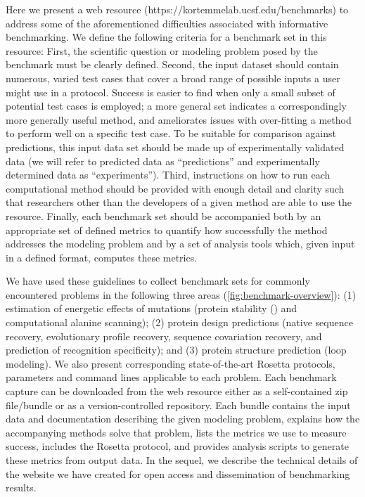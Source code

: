 Here we present a web resource (https://kortemmelab.ucsf.edu/benchmarks) to address some of the aforementioned difficulties associated with informative benchmarking. We define the following criteria for a benchmark set in this resource: First, the scientific question or modeling problem posed by the benchmark must be clearly defined. Second, the input dataset should contain numerous, varied test cases that cover a broad range of possible inputs a user might use in a protocol. Success is easier to find when only a small subset of potential test cases is employed; a more general set indicates a correspondingly more generally useful method, and ameliorates issues with over-fitting a method to perform well on a specific test case. To be suitable for comparison against predictions, this input data set should be made up of experimentally validated data (we will refer to predicted data as ``predictions'' and experimentally determined data as ``experiments''). Third, instructions on how to run each computational method should be provided with enough detail and clarity such that researchers other than the developers of a given method are able to use the resource. Finally, each benchmark set should be accompanied both by an appropriate set of defined metrics to quantify how successfully the method addresses the modeling problem and by a set of analysis tools which, given input in a defined format, computes these metrics.

We have used these guidelines to collect benchmark sets for commonly encountered problems in the following three areas (\cref{fig:benchmark-overview}): (1) estimation of energetic effects of mutations (protein stability (\ddg) and computational alanine scanning); (2) protein design predictions (native sequence recovery, evolutionary profile recovery, sequence covariation recovery, and prediction of recognition specificity); and (3) protein structure prediction (loop modeling). We also present corresponding state-of-the-art Rosetta protocols, parameters and command lines applicable to each problem. Each benchmark capture can be downloaded from the web resource either as a self-contained zip file/bundle or as a version-controlled repository. Each bundle contains the input data and documentation describing the given modeling problem, explains how the accompanying methods solve that problem, lists the metrics we use to measure success, includes the Rosetta protocol, and provides analysis scripts to generate these metrics from output data. In the sequel, we describe the technical details of the website we have created for open access and dissemination of benchmarking results.

